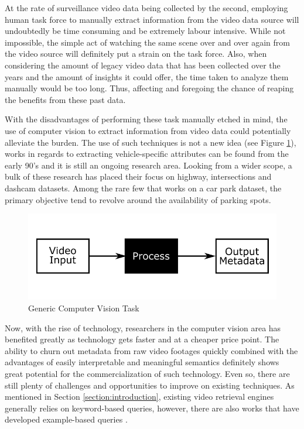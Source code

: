 
At the rate of surveillance video data being collected by the second, employing human task force to manually extract information from the video data source will undoubtedly be time consuming and be extremely labour intensive. 
While not impossible, the simple act of watching the same scene over and over again from the video source will definitely put a strain on the task force. Also, when considering the amount of legacy video data that has been collected over the years and the amount of insights it could offer, the time taken to analyze them manually would be too long. Thus, affecting and foregoing the chance of reaping the benefits from these past data.
 
With the disadvantages of performing these task manually etched in mind, the use of computer vision to extract information from video data could potentially alleviate the burden. The use of such techniques is not a new idea (see Figure \ref{fig:genericCV}), works in regards to extracting vehicle-specific attributes can be found from the early 90's and it is still an ongoing research area. Looking from a wider scope, a bulk of these research has placed their focus on highway, intersections and dashcam datasets. Among the rare few that works on a car park dataset, the primary objective tend to revolve around the availability of parking spots.

\begin{figure}[!hbt]\centering
\includegraphics[width=.8\textwidth]{image/general/simpleframe.png}
\caption{Generic Computer Vision Task}
\label{fig:genericCV}
\end{figure}

Now, with the rise of technology, researchers in the computer vision area has benefited greatly as technology gets faster and at a cheaper price point. The ability to churn out metadata from raw video footages quickly combined with the advantages of easily interpretable and meaningful semantics definitely shows great potential for the commercialization of such technology. Even so, there are still plenty of challenges and opportunities to improve on existing techniques. As mentioned in Section \ref{section:introduction}, existing video retrieval engines generally relies on keyword-based queries, however, there are also works that have developed example-based queries . 

